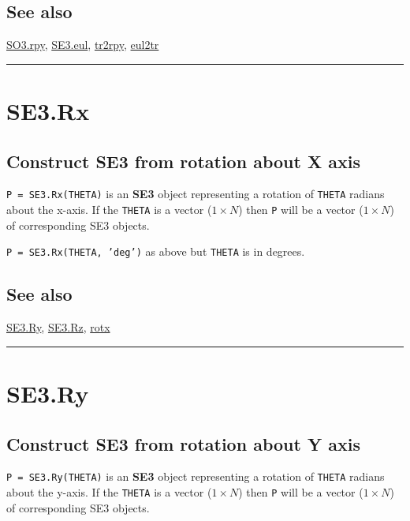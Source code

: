 \subsection*{See also}


\hyperlink{SO3.rpy}{\color{blue} SO3.rpy}, \hyperlink{SE3.eul}{\color{blue} SE3.eul}, \hyperlink{tr2rpy}{\color{blue} tr2rpy}, \hyperlink{eul2tr}{\color{blue} eul2tr}

\vspace{1.5ex}\hrule

\hypertarget{SE3.Rx}{\section*{SE3.Rx}}
\subsection*{Construct SE3 from rotation about X axis}


\texttt{P = SE3.Rx(THETA)} is an \textbf{\color{red} SE3} object representing a rotation of \texttt{THETA}
radians about the x-axis.  If the \texttt{THETA} is a vector ($1 \times N$) then \texttt{P} will be
a vector ($1 \times N$) of corresponding SE3 objects.



\texttt{P = SE3.Rx(THETA, 'deg')} as above but \texttt{THETA} is in degrees.


\subsection*{See also}


\hyperlink{SE3.Ry}{\color{blue} SE3.Ry}, \hyperlink{SE3.Rz}{\color{blue} SE3.Rz}, \hyperlink{rotx}{\color{blue} rotx}

\vspace{1.5ex}\hrule

\hypertarget{SE3.Ry}{\section*{SE3.Ry}}
\subsection*{Construct SE3 from rotation about Y axis}


\texttt{P = SE3.Ry(THETA)} is an \textbf{\color{red} SE3} object representing a rotation of \texttt{THETA}
radians about the y-axis.  If the \texttt{THETA} is a vector ($1 \times N$) then \texttt{P} will be
a vector ($1 \times N$) of corresponding SE3 objects.



